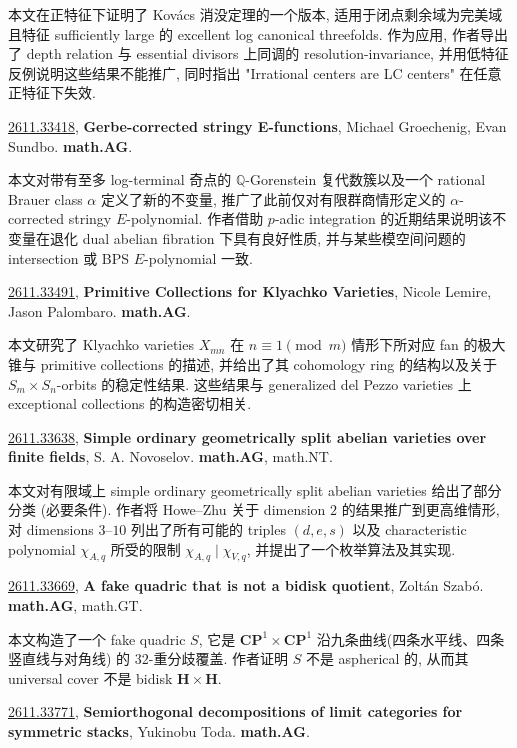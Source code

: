 \documentclass[9pt, a4paper]{article}
\theoremstyle{plain}
\theoremstyle{definition}
\theoremstyle{remark}
\newcommand{\arxivwithtarget}[3]{\hypertarget{#1}{}\href{https://arxiv.org/abs/#1}{#1}, \textbf{\textcolor{arxivblue}{#2}}, #3. }
\begin{document}
本文在正特征下证明了 Kovács 消没定理的一个版本, 适用于闭点剩余域为完美域且特征 sufficiently large 的 excellent log canonical threefolds. 作为应用, 作者导出了 depth relation 与 essential divisors 上同调的 resolution-invariance, 并用低特征反例说明这些结果不能推广, 同时指出 "Irrational centers are LC centers" 在任意正特征下失效.


\arxivwithtarget{2611.33418}{Gerbe-corrected stringy E-functions}{Michael Groechenig, Evan Sundbo}\textbf{math.AG}.

本文对带有至多 log-terminal 奇点的 $\mathbb{Q}$-Gorenstein 复代数簇以及一个 rational Brauer class $\alpha$ 定义了新的不变量, 推广了此前仅对有限群商情形定义的 $\alpha$-corrected stringy $E$-polynomial. 作者借助 $p$-adic integration 的近期结果说明该不变量在退化 dual abelian fibration 下具有良好性质, 并与某些模空间问题的 intersection 或 BPS $E$-polynomial 一致.


\arxivwithtarget{2611.33491}{Primitive Collections for Klyachko Varieties}{Nicole Lemire, Jason Palombaro}\textbf{math.AG}.

本文研究了 Klyachko varieties \(X_{mn}\) 在 \(n \equiv 1 \pmod{m}\) 情形下所对应 fan 的极大锥与 primitive collections 的描述, 并给出了其 cohomology ring 的结构以及关于 \(S_m \times S_n\)-orbits 的稳定性结果. 这些结果与 generalized del Pezzo varieties 上 exceptional collections 的构造密切相关.


\arxivwithtarget{2611.33638}{Simple ordinary geometrically split abelian varieties over finite fields}{S. A. Novoselov}\textbf{math.AG}, math.NT.

本文对有限域上 simple ordinary geometrically split abelian varieties 给出了部分分类 (必要条件). 作者将 Howe--Zhu 关于 dimension $2$ 的结果推广到更高维情形, 对 dimensions $3$--$10$ 列出了所有可能的 triples $(d, e, s)$ 以及 characteristic polynomial $\chi_{A,q}$ 所受的限制 $\chi_{A,q} \mid \chi_{V,q}$, 并提出了一个枚举算法及其实现.


\arxivwithtarget{2611.33669}{A fake quadric that is not a bidisk quotient}{Zoltán Szabó}\textbf{math.AG}, math.GT.

本文构造了一个 fake quadric \(S\), 它是 \(\mathbf{CP}^1\times\mathbf{CP}^1\) 沿九条曲线(四条水平线、四条竖直线与对角线) 的 \(32\)-重分歧覆盖. 作者证明 \(S\) 不是 aspherical 的, 从而其 universal cover 不是 bidisk \(\mathbf{H}\times\mathbf{H}\).


\arxivwithtarget{2611.33771}{Semiorthogonal decompositions of limit categories for symmetric stacks}{Yukinobu Toda}\textbf{math.AG}.
\end{document}

